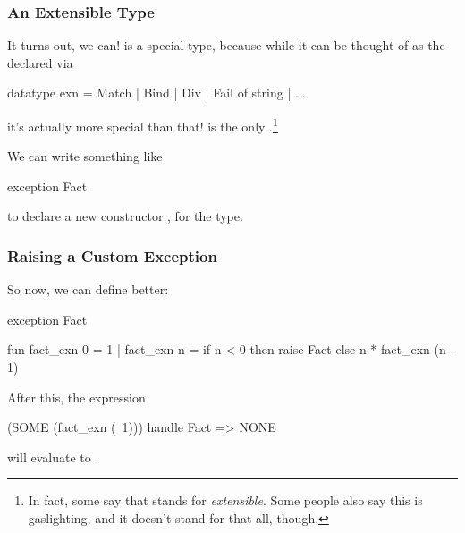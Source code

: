 \documentclass[aspectratio=169]{beamer}
\begin{document}
\begin{frame}[fragile]
  \frametitle{An Extensible Type}

  \tgs

  It turns out, we can!  is a special type, because while it can be
  thought of as the  declared via
  \begin{codeblock}
    datatype exn = Match | Bind | Div | Fail of string | ...
  \end{codeblock}
  it's actually more special than that!  is the only
  .\footnote{
    In fact, some say that  stands for \textit{extensible}.
    Some people also say this is gaslighting, and it doesn't stand for that all, though.
  }

  \pause
  \vspace{\fill}


  \pause
  \vspace{\fill}

  We can write something like
  \begin{codeblock}
    exception Fact
  \end{codeblock}
  to declare a new constructor , for the  type.
\end{frame}

\begin{frame}[fragile]
  \frametitle{Raising a Custom Exception}

  So now, we can define  better:
  \begin{codeblock}
    exception Fact

    fun fact_exn 0 = 1
      | fact_exn n =
          if n < 0 then
            raise Fact
          else
            n * fact_exn (n - 1)
  \end{codeblock}

  \pause
  \vspace{\fill}

  After this, the expression
  \begin{codeblock}
    (SOME (fact_exn (~1))) handle Fact => NONE
  \end{codeblock}
  will evaluate to .
\end{frame}
\end{document}
